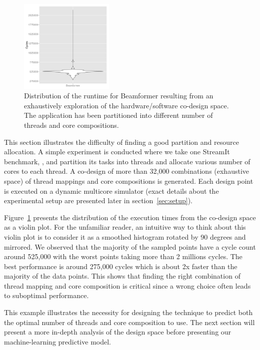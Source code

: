 \begin{figure}[t]
    \centering
    \includegraphics[width=0.4\textwidth]{streamit-paper/graphics/beamformer_motivation.pdf}
    \caption{Distribution of the runtime for Beamformer resulting from an exhaustively exploration of the hardware/software co-design space.
     The application has been partitioned into different number of threads and core compositions.}
     \label{fig:beamformermotiv}
\vspace{-5mm}
\end{figure}

This section illustrates the difficulty of finding a good partition and resource allocation.
A simple experiment is conducted where we take one StreamIt benchmark, , and partition its tasks into threads and allocate various number of cores to each thread.
A co-design of more than 32,000 combinations (exhaustive space) of thread mappings and core compositions is generated.
Each design point is executed on a dynamic multicore simulator (exact details about the experimental setup are presented later in section~\ref{sec:setup}).

Figure~\ref{fig:beamformermotiv} presents the distribution of the execution times from the co-design space as a violin plot.
For the unfamiliar reader, an intuitive way to think about this violin plot is to consider it as a smoothed histogram rotated by 90 degrees and mirrored.
We observed that the majority of the sampled points have a cycle count around 525,000 with the worst points taking more than 2 millions cycles.
The best performance is around 275,000 cycles which is about 2x faster than the majority of the data points.
This shows that finding the right combination of thread mapping and core composition is critical since a wrong choice often leads to suboptimal performance.

This example illustrates the necessity for designing the technique to predict both the optimal number of threads and core composition to use.
The next section will present a more in-depth analysis of the design space before presenting our machine-learning predictive model.

